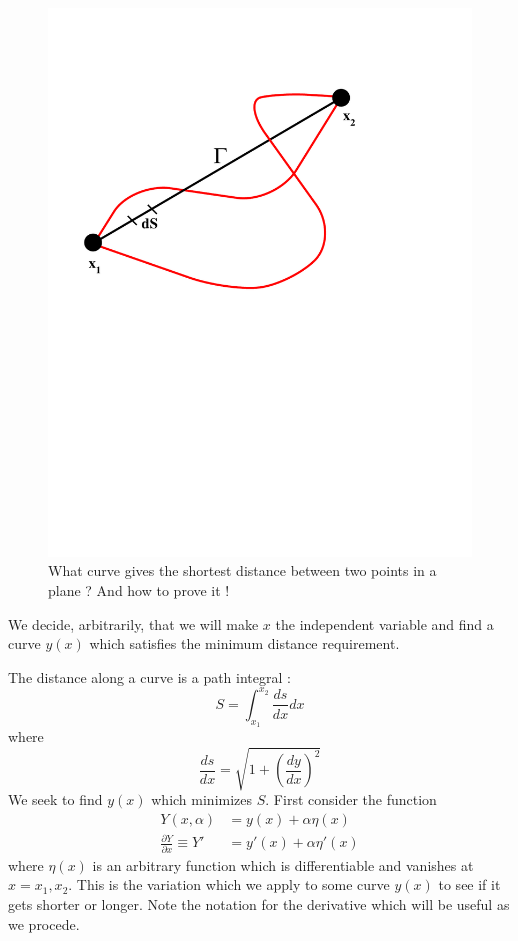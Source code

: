 \documentclass[10pt]{article}
\begin{document}
	
		\begin{figure}[h]           
			\begin{center}
	 			 \includegraphics[width=0.66\linewidth]{Diagrams/varn_strt.pdf}
	 			\caption[]{What curve gives the shortest distance between two
	 			points in a plane ?  And how to prove it !}
	 			\label{fig:varn2}
	 		\end{center}
		\end{figure}
	
		We decide, arbitrarily, that we will make $x$ the independent variable
		and find a curve $y(x)$ which satisfies the minimum distance requirement.
		
		The distance along a curve is a path integral :
			\begin{equation}
				S = \int_{x_1}^{x_2} \frac{ds}{dx} dx	
			\end{equation}
		where
			\begin{equation}
				\frac{ds}{dx} = \sqrt{1 + \left( \frac{dy}{dx} \right)^2}
			\end{equation}
		We seek to find $y(x)$ which minimizes $S$. First consider the 
		function
			\begin{equation}
				\begin{split}
				Y(x,\alpha) &= y(x) + \alpha \eta(x) \\
				\frac{\partial Y}{\partial x} \equiv Y' &= y'(x) + \alpha \eta'(x)
				\end{split}
			\end{equation}
		where $\eta(x)$ is an arbitrary function which is differentiable and
		vanishes at $x=x_1,x_2$. This is the variation which we apply to
		some curve $y(x)$ to see if it gets shorter or longer. Note the notation
		for the derivative which will be useful as we procede.
	
\end{document}

